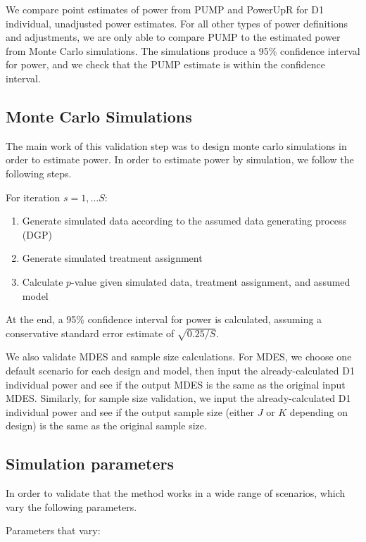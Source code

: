 \documentclass[
]{article}
\providecommand{\tightlist}{%
  \setlength{\itemsep}{0pt}\setlength{\parskip}{0pt}}
\begin{document}
We compare point estimates of power from PUMP and PowerUpR for D1
individual, unadjusted power estimates. For all other types of power
definitions and adjustments, we are only able to compare PUMP to the
estimated power from Monte Carlo simulations. The simulations produce a
95\% confidence interval for power, and we check that the PUMP estimate
is within the confidence interval.

\subsection{Monte Carlo Simulations}

The main work of this validation step was to design monte carlo
simulations in order to estimate power. In order to estimate power by
simulation, we follow the following steps.

For iteration \(s = 1, \dots S\):

\begin{enumerate}
\def\labelenumi{\arabic{enumi}.}
\tightlist
\item
  Generate simulated data according to the assumed data generating
  process (DGP)
\item
  Generate simulated treatment assignment
\item
  Calculate \(p\)-value given simulated data, treatment assignment, and
  assumed model
\end{enumerate}

At the end, a 95\% confidence interval for power is calculated, assuming
a conservative standard error estimate of \(\sqrt{0.25/S}\).

We also validate MDES and sample size calculations. For MDES, we choose
one default scenario for each design and model, then input the
already-calculated D1 individual power and see if the output MDES is the
same as the original input MDES. Similarly, for sample size validation,
we input the already-calculated D1 individual power and see if the
output sample size (either \(J\) or \(K\) depending on design) is the
same as the original sample size.

\subsection{Simulation parameters}

In order to validate that the method works in a wide range of scenarios,
which vary the following parameters.

Parameters that vary:
\end{document}

